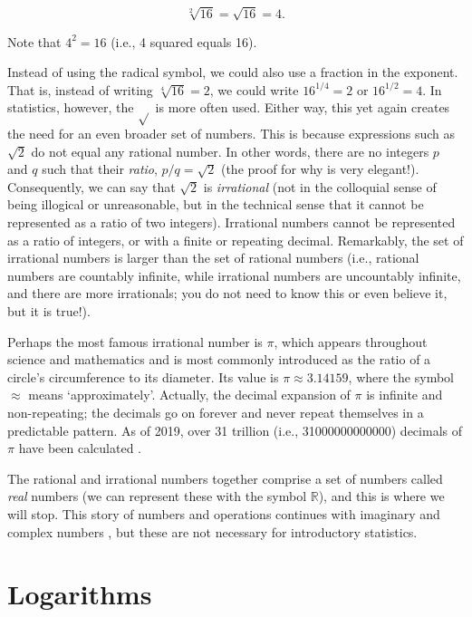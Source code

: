 \documentclass[
]{scrbook}
\begin{document}
\[\sqrt[2]{16} = \sqrt{16} = 4.\]

Note that \(4^{2} = 16\) (i.e., 4 squared equals 16).

Instead of using the radical symbol, we could also use a fraction in the exponent.
That is, instead of writing \(\sqrt[4]{16} = 2\), we could write \(16^{1/4} = 2\) or \(16^{1/2} = 4\).
In statistics, however, the \(\sqrt{}\) is more often used.
Either way, this yet again creates the need for an even broader set of numbers.
This is because expressions such as \(\sqrt{2}\) do not equal any rational number.
In other words, there are no integers \(p\) and \(q\) such that their \emph{ratio}, \(p/q = \sqrt{2}\) (the proof for why is very elegant!).
Consequently, we can say that \(\sqrt{2}\) is \emph{irrational} (not in the colloquial sense of being illogical or unreasonable, but in the technical sense that it cannot be represented as a ratio of two integers).
Irrational numbers cannot be represented as a ratio of integers, or with a finite or repeating decimal.
Remarkably, the set of irrational numbers is larger than the set of rational numbers (i.e., rational numbers are countably infinite, while irrational numbers are uncountably infinite, and there are more irrationals; you do not need to know this or even believe it, but it is true!).

Perhaps the most famous irrational number is \(\pi\), which appears throughout science and mathematics and is most commonly introduced as the ratio of a circle's circumference to its diameter.
Its value is \(\pi \approx 3.14159\), where the symbol \(\approx\) means `approximately'.
Actually, the decimal expansion of \(\pi\) is infinite and non-repeating; the decimals go on forever and never repeat themselves in a predictable pattern.
As of 2019, over 31 trillion (i.e., 31000000000000) decimals of \(\pi\) have been calculated \citep{Yee2019}.

The rational and irrational numbers together comprise a set of numbers called \emph{real} numbers (we can represent these with the symbol \(\mathbb{R}\)), and this is where we will stop.
This story of numbers and operations continues with imaginary and complex numbers \citep{Courant1996, Pastor2008}, but these are not necessary for introductory statistics.

\hypertarget{logarithms}{%
\section{Logarithms}\label{logarithms}}
\end{document}
